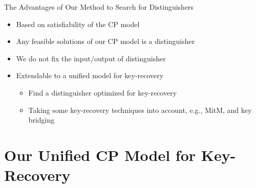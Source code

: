 \documentclass[table,aspectratio=169]{beamer}
\begin{document}
\begin{frame}{The Advantages of Our Method to Search for Distinguishers}
\begin{itemize}
  \item Based on satisfiability of the CP model
  \item Any feasible solutions of our CP model is a distinguisher
  \item We do not fix the input/output of distinguisher
  \item Extendable to a unified model for key-recovery
  \begin{itemize}
    \item Find a distinguisher optimized for key-recovery
    \item Taking some key-recovery techniques into account, e.g., MitM, and key bridging
  \end{itemize}
\end{itemize}
\end{frame}

\section{Our Unified CP Model for Key-Recovery}
\end{document}
